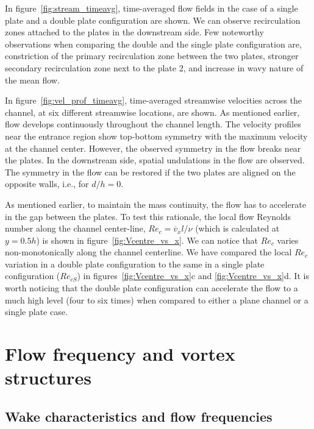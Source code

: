 \documentclass[aps,pre,twocolumn,aps,longbibliography]{revtex4-1}
\begin{document}
	
	In figure~\ref{fig:stream_timeavg}, time-averaged flow fields in the case of a single plate and a double plate configuration are shown. We can observe recirculation zones attached to the plates in the downstream side. Few noteworthy observations when comparing the double and the single plate configuration are, constriction of the primary recirculation zone between the two plates, stronger secondary recirculation zone next to the plate 2, and increase in wavy nature of the mean flow.
	
	
	In figure~\ref{fig:vel_prof_timeavg}, time-averaged streamwise velocities across the channel, at six different streamwise locations, are shown. As mentioned earlier, flow develops continuously throughout the channel length. The velocity profiles near the entrance region show top-bottom symmetry with the maximum velocity at the channel center. However, the observed symmetry in the flow breaks near the plates. In the downstream side, spatial undulations in the flow are observed. The symmetry in the flow can be restored if the two plates are aligned on the opposite walls, i.e., for $d/h=0$.
	
	
	As mentioned earlier, to maintain the mass continuity, the flow has to accelerate in the gap between the plates. To test this rationale, the local flow Reynolds number along the channel center-line, $Re_c=\overline{v}_xl/\nu$ (which is calculated at $y=0.5h$) is shown in figure~\ref{fig:Vcentre_vs_x}. We can notice that $Re_c$ varies non-monotonically along the channel centerline. We have compared the local $Re_c$ variation in a double plate configuration to the same in a single plate configuration ($Re_{cS}$) in figures~\ref{fig:Vcentre_vs_x}c and \ref{fig:Vcentre_vs_x}d. It is worth noticing that the double plate configuration can accelerate the flow to a much high level (four to six times) when compared to either a plane channel or a single plate case.
	
	
	\section{Flow frequency and vortex structures}
	
	\subsection{Wake characteristics and flow frequencies}
	
\end{document}
